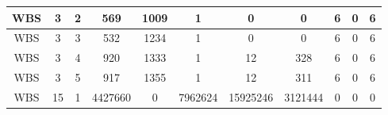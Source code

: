 \begin{table*}[]
\begin{tabular}{@{}ccccccccccc@{}}
        WBS                                                      & 3                                                          & 2    & 569                                                         & 1009                                                                      & 1                                                       & 0                                                          & 0                                                              & 6                                                         & 0                                                         & 6       \\ \midrule
        WBS                                                      & 3                                                          & 3    & 532                                                         & 1234                                                                      & 1                                                       & 0                                                          & 0                                                              & 6                                                         & 0                                                         & 6       \\ \midrule
        WBS                                                      & 3                                                          & 4    & 920                                                         & 1333                                                                      & 1                                                       & 12                                                         & 328                                                            & 6                                                         & 0                                                         & 6       \\ \midrule
        WBS                                                      & 3                                                          & 5    & 917                                                         & 1355                                                                      & 1                                                       & 12                                                         & 311                                                            & 6                                                         & 0                                                         & 6       \\ \midrule
        WBS                                                      & 15                                                         & 1    & 4427660                                                     & 0                                                                         & 7962624                                                 & 15925246                                                   & 3121444                                                        & 0                                                         & 0                                                         & 0       \\ \midrule

\end{tabular}
\end{table*}
